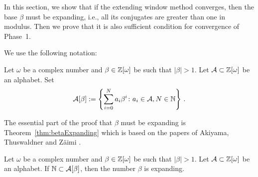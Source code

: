 In this section, we show that if the extending window method converges, then the base $\beta$ must be expanding, i.e., all its conjugates  are greater than one in modulus. Then we prove that it is also sufficient condition for convergence of Phase~1.

We use the following notation:
\begin{defn}
Let $\omega$ be a complex number and $\beta \in\mathbb{Z}[\omega]$ be such that $|\beta|>1$. Let $\mathcal{A}\subset \mathbb{Z}[\omega]$ be an alphabet. Set 
$$
\mathcal{A}[\beta]:=\left\{\sum_{i=0}^N a_i \beta^i \colon a_i\in\mathcal{A}, N\in\mathbb{N}\right\}\,.
$$
\end{defn}

The essential part of the proof that $\beta$ must be expanding is Theorem~\ref{thm:betaExpanding} which is based on the papers of Akiyama, Thuswaldner and Zäimi \cite{Akiyama201528,Akiyama20131616}.
\begin{thm}\label{thm:betaExpanding}
Let $\omega$ be a complex number and $\beta \in\mathbb{Z}[\omega]$ be such that $|\beta|>1$. Let $\mathcal{A}\subset \mathbb{Z}[\omega]$ be an alphabet. If $\mathbb{N}\subset \mathcal{A}[\beta]$, then the number $\beta$ is expanding.
\end{thm}
